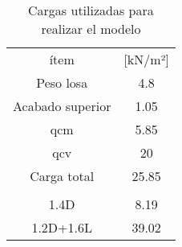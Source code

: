 \begin{table}[H]
  \centering
    \begin{tabular}{|c|c|}
    \hline
    \rowcolor[rgb]{ .2,  .247,  .31} \textcolor[rgb]{ 1,  1,  1}{ítem} & \textcolor[rgb]{ 1,  1,  1}{[kN/m²]} \bigstrut[t]\\
    \rowcolor[rgb]{ .2,  .247,  .31} \textcolor[rgb]{ 1,  1,  1}{Peso losa} & \cellcolor[rgb]{ 1,  1,  1}4.8 \\
    \rowcolor[rgb]{ .2,  .247,  .31} \textcolor[rgb]{ 1,  1,  1}{Acabado superior} & \cellcolor[rgb]{ 1,  1,  1}1.05 \\
    \rowcolor[rgb]{ .2,  .247,  .31} \textcolor[rgb]{ 1,  1,  1}{qcm} & \cellcolor[rgb]{ 1,  1,  1}5.85 \\
    \rowcolor[rgb]{ .2,  .247,  .31} \textcolor[rgb]{ 1,  1,  1}{qcv} & \cellcolor[rgb]{ 1,  1,  1}20 \\
    \rowcolor[rgb]{ .2,  .247,  .31} \textcolor[rgb]{ 1,  1,  1}{Carga total} & \cellcolor[rgb]{ 1,  1,  1}25.85 \bigstrut[b]\\
\cline{2-2}    \multicolumn{1}{r}{} & \multicolumn{1}{r}{} \bigstrut[t]\\
    \rowcolor[rgb]{ .2,  .247,  .31} \textcolor[rgb]{ 1,  1,  1}{1.4D} & \cellcolor[rgb]{ 1,  1,  1}8.19 \\
    \rowcolor[rgb]{ .2,  .247,  .31} \textcolor[rgb]{ 1,  1,  1}{1.2D+1.6L} & \cellcolor[rgb]{ 1,  1,  1}39.02 \bigstrut[b]\\
\cline{2-2}    \end{tabular}%
  \caption{Cargas utilizadas para realizar el modelo}
  \label{tab:Cargas losa}%
\end{table}%
